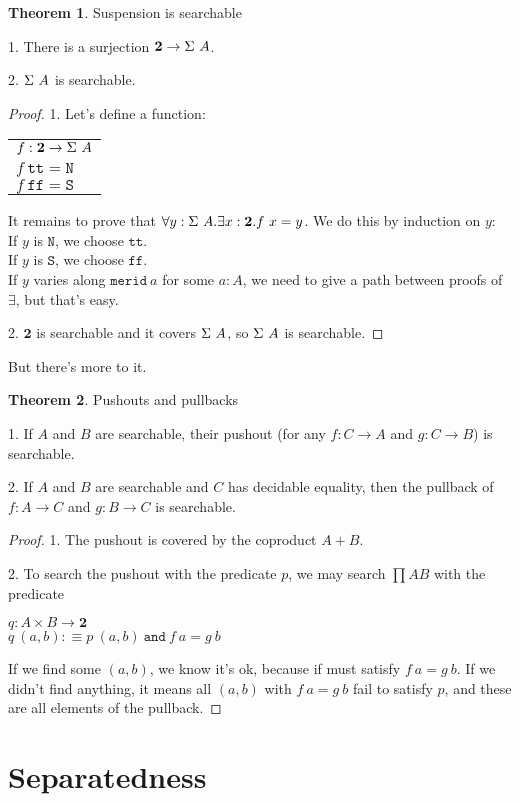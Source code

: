 \documentclass[11pt]{article}
\theoremstyle{definition}
\newtheorem{theorem}{Theorem}[section]
\newcommand{\txt}[1]{\texttt{#1}}
\renewcommand{\(}{\left(}
\renewcommand{\)}{\right)}
\newcommand{\defn}{:\equiv}
\newcommand{\apl}[2]{#1\ #2}
\newcommand{\Bool}{\mathbf{2}}
\newcommand{\true}{\txt{tt}}
\newcommand{\false}{\txt{ff}}
\newcommand{\prodt}[2]{#1 \times #2}
\newcommand{\all}[2]{\forall #1.#2}
\newcommand{\ex}[2]{\exists #1.#2}
\begin{document}
\begin{theorem} Suspension is searchable

1. There is a surjection $\Bool \to \apl{\Susp}{A}$.

2. $\apl{\Susp}{A}$ is searchable.

\end{theorem}
\newcommand{\SuspNorth}{\txt{N}}
\newcommand{\SuspSouth}{\txt{S}}
\newcommand{\SuspMerid}{\txt{merid}}
\begin{proof}

1. Let's define a function:

\begin{center}
\begin{tabular}{l}
$f : \Bool \to \apl{\Susp}{A}$ \\
$\apl{f}{\true} = \SuspNorth$ \\
$\apl{f}{\false} = \SuspSouth$ \\
\end{tabular}
\end{center}

It remains to prove that $\all{y : \apl{\Susp}{A}}{\ex{x : \Bool}{\apl{f}{x} = y}}$. We do this by induction on $y$: \\
If $y$ is $\SuspNorth$, we choose $\true$. \\
If $y$ is $\SuspSouth$, we choose $\false$. \\
If $y$ varies along $\apl{\SuspMerid}{a}$ for some $a : A$, we need to give a path between proofs of $\exists$, but that's easy.

2. $\Bool$ is searchable and it covers $\apl{\Susp}{A}$, so $\apl{\Susp}{A}$ is searchable.

\end{proof}

But there's more to it.

\begin{theorem} Pushouts and pullbacks

1. If $A$ and $B$ are searchable, their pushout (for any $f : C \to A$ and $g : C \to B$) is searchable.

2. If $A$ and $B$ are searchable and $C$ has decidable equality, then the pullback of $f: A \to C$ and $g : B \to C$ is searchable.
\end{theorem}
\begin{proof}

1. The pushout is covered by the coproduct $A + B$.

2. To search the pushout with the predicate $p$, we may search $\prod{A}{B}$ with the predicate

\begin{center}
$q : \prodt{A}{B} \to \Bool$ \\
$\apl{q}{(a, b)} \defn \apl{p}{(a, b)}\ \txt{and}\ \apl{f}{a} = \apl{g}{b}$
\end{center}

If we find some $(a, b)$, we know it's ok, because if must satisfy $\apl{f}{a} = \apl{g}{b}$. If we didn't find anything, it means all $(a, b)$ with $\apl{f}{a} = \apl{g}{b}$ fail to satisfy $p$, and these are all elements of the pullback.

\end{proof}

\section{Separatedness}
\end{document}
